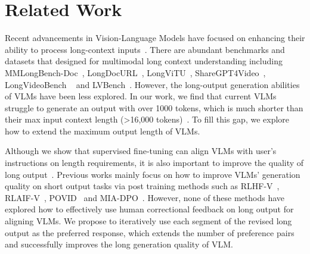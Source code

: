 \section{Related Work}
Recent advancements in Vision-Language Models have focused on enhancing their ability to process long-context inputs~\cite{ge2024v2pe,li2024giraffe,chen2024internvl}. There are abundant benchmarks and datasets that designed for multimodal long context understanding including MMLongBench-Doc~\cite{ma2024mmlongbench}, LongDocURL~\cite{deng2024longdocurl}, LongViTU~\cite{wu2025longvitu}, ShareGPT4Video~\cite{chen2024sharegpt4video}, LongVideoBench ~\cite{wu2024longvideobench} and LVBench~\cite{wang2024lvbench}. However, the long-output generation abilities of VLMs have been less explored. In our work, we find that current VLMs struggle to generate an output with over 1000 tokens, which is much shorter than their max input context length (>16,000 tokens)~\cite{wang2024qwen2}. To fill this gap, we explore how to extend the maximum output length of VLMs.


Although we show that supervised fine-tuning can align VLMs with user's instructions on length requirements, it is also important to improve the quality of long output~\cite{wu2024longgenbench}. Previous works mainly focus on how to improve VLMs' generation quality on short output tasks via post training methods such as RLHF-V~\cite{yu2024rlhf}, RLAIF-V~\cite{yu2024rlaif}, POVID~\cite{zhou2024aligning} and MIA-DPO~\cite{liu2024mia}. However, none of these methods have explored how to effectively use human correctional feedback on long output for aligning VLMs. We propose to iteratively use each segment of the revised long output as the preferred response, which extends the number of preference pairs and successfully improves the long generation quality of VLM.


\begin{table}[t]
\centering
{}
\caption{Scores (\%) on MMLongBench-Write for models trained under different conditions, where $S$, $S_l$ and $S_q$ is the overall, length and quality score on all tasks and $S_{PPT}$ is the overall score on the PPT script task.}
\label{tb:mem}
\end{table}